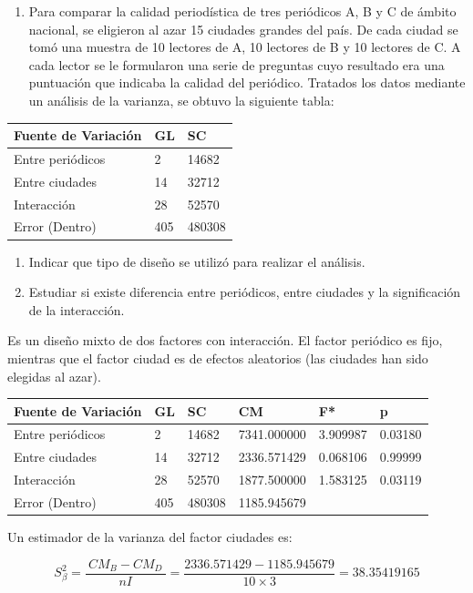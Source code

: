 \documentclass[]{book}
\providecommand{\tightlist}{%
  \setlength{\itemsep}{0pt}\setlength{\parskip}{0pt}}
\theoremstyle{definition}
\theoremstyle{definition}
\theoremstyle{definition}
\theoremstyle{remark}
\begin{document}
\begin{enumerate}
\def\labelenumi{\arabic{enumi})}
\setcounter{enumi}{1}
\tightlist
\item
  Para comparar la calidad periodística de tres periódicos A, B y C de
  ámbito nacional, se eligieron al azar 15 ciudades grandes del país. De
  cada ciudad se tomó una muestra de 10 lectores de A, 10 lectores de B
  y 10 lectores de C. A cada lector se le formularon una serie de
  preguntas cuyo resultado era una puntuación que indicaba la calidad
  del periódico. Tratados los datos mediante un análisis de la varianza,
  se obtuvo la siguiente tabla:
\end{enumerate}

\begin{longtable}[]{@{}lll@{}}
\toprule
Fuente de Variación & GL & SC\tabularnewline
\midrule
\endhead
Entre periódicos & 2 & 14682\tabularnewline
Entre ciudades & 14 & 32712\tabularnewline
Interacción & 28 & 52570\tabularnewline
Error (Dentro) & 405 & 480308\tabularnewline
\bottomrule
\end{longtable}

\begin{enumerate}
\def\labelenumi{\arabic{enumi}.}
\item
  Indicar que tipo de diseño se utilizó para realizar el análisis.
\item
  Estudiar si existe diferencia entre periódicos, entre ciudades y la
  significación de la interacción.
\end{enumerate}

Es un diseño mixto de dos factores con interacción. El factor periódico
es fijo, mientras que el factor ciudad es de efectos aleatorios (las
ciudades han sido elegidas al azar).

\begin{longtable}[]{@{}llllll@{}}
\toprule
Fuente de Variación & \textbf{GL} & \textbf{SC} & \textbf{CM} &
\textbf{F*} & \textbf{p}\tabularnewline
\midrule
\endhead
Entre periódicos & 2 & 14682 & 7341.000000 & 3.909987 &
0.03180\tabularnewline
Entre ciudades & 14 & 32712 & 2336.571429 & 0.068106 &
0.99999\tabularnewline
Interacción & 28 & 52570 & 1877.500000 & 1.583125 &
0.03119\tabularnewline
Error (Dentro) & 405 & 480308 & 1185.945679 & &\tabularnewline
\bottomrule
\end{longtable}

Un estimador de la varianza del factor ciudades es:

\[
S_{\beta}^{2} = \frac{\left. \ CM_{B} - CM_{D} \right.\ }{nI} = \frac{2336.571429 - 1185.945679}{10 \times 3} = 38.35419165
\]
\end{document}
